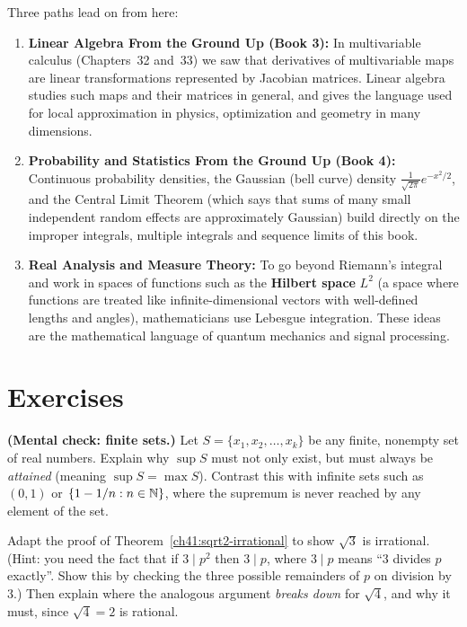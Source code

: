 \begin{connectionbox}
Three paths lead on from here:
\begin{enumerate}
  \item \textbf{Linear Algebra From the Ground Up (Book 3):}
        In multivariable calculus (Chapters~32 and~33) we saw that derivatives of multivariable
        maps are linear transformations represented by Jacobian matrices. Linear algebra
        studies such maps and their matrices in general, and gives the language used for
        local approximation in physics, optimization and geometry in many dimensions.
  \item \textbf{Probability and Statistics From the Ground Up (Book 4):}
        Continuous probability densities, the Gaussian (bell curve) density
        $\frac{1}{\sqrt{2\pi}}e^{-x^2/2}$, and the Central Limit Theorem (which says that sums
        of many small independent random effects are approximately Gaussian) build directly
        on the improper integrals, multiple integrals and sequence limits of this book.
  \item \textbf{Real Analysis and Measure Theory:}
        To go beyond Riemann's integral and work in spaces of functions such as the
        \textbf{Hilbert space} $L^2$ (a space where functions are treated like
        infinite-dimensional vectors with well-defined lengths and angles), mathematicians
        use Lebesgue integration. These ideas are the mathematical language of quantum
        mechanics and signal processing.
\end{enumerate}
\end{connectionbox}

\section{Exercises}
\label{ch41:exercises}

\begin{exercise}
\label{ch41:ex-finite-max}
\textbf{(Mental check: finite sets.)} Let $S = \{x_1, x_2, \ldots, x_k\}$ be any finite, nonempty set of real numbers.
Explain why $\sup S$ must not only exist, but must always be \emph{attained} (meaning $\sup S = \max S$).
Contrast this with infinite sets such as $(0,1)$ or $\{1 - 1/n : n \in \mathbb{N}\}$, where the supremum is never reached by any element of the set.
\end{exercise}

\begin{exercise}
\label{ch41:ex-sqrt3}
Adapt the proof of Theorem~\ref{ch41:sqrt2-irrational} to show $\sqrt 3$ is irrational.
(Hint: you need the fact that if $3 \mid p^2$ then $3 \mid p$, where $3 \mid p$ means ``$3$
divides $p$ exactly''. Show this by checking the three possible remainders of $p$ on division
by $3$.) Then explain where the analogous argument \emph{breaks down}
for $\sqrt 4$, and why it must, since $\sqrt4=2$ is rational.
\end{exercise}

